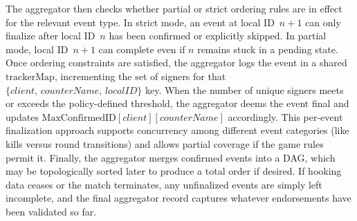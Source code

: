 \documentclass[11pt]{article}
\begin{document}
The aggregator then checks whether partial or strict ordering rules are in effect for the relevant event type. In strict mode, an event at local ID~\(n+1\) can only finalize after local ID~\(n\) has been confirmed or explicitly skipped. In partial mode, local ID~\(n+1\) can complete even if \(n\) remains stuck in a pending state. Once ordering constraints are satisfied, the aggregator logs the event in a shared \(\text{trackerMap}\), incrementing the set of signers for that \(\{client,\,counterName,\,localID\}\) key. When the number of unique signers meets or exceeds the policy-defined threshold, the aggregator deems the event final and updates \(\text{MaxConfirmedID}[client][counterName]\) accordingly. This per-event finalization approach supports concurrency among different event categories (like kills versus round transitions) and allows partial coverage if the game rules permit it. Finally, the aggregator merges confirmed events into a DAG, which may be topologically sorted later to produce a total order if desired. If hooking data ceases or the match terminates, any unfinalized events are simply left incomplete, and the final aggregator record captures whatever endorsements have been validated so far.
\end{document}
